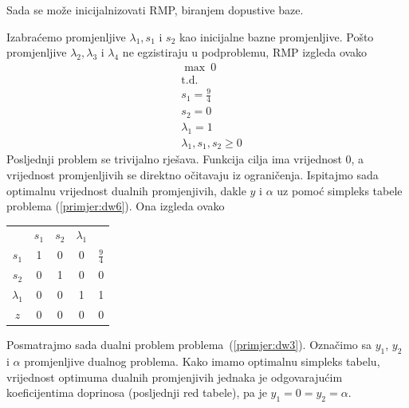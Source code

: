 \documentclass[b5paper, utf8, 11pt, colorlinks]{book}
\theoremstyle{definition}
\begin{document}
Sada se može inicijalnizovati RMP, biranjem dopustive baze.

Izabraćemo promjenljive $\lambda_1, s_1$ i $s_2$ kao inicijalne bazne promjenljive. Pošto  promjenljive $\lambda_2,\lambda_3$ i $\lambda_4$ ne egzistiraju u podproblemu,  RMP izgleda ovako
      \begin{equation}
	\begin{aligned}\label{primjer:dw6}
		&\max\   0\\
		&\mbox{t.d.}\\  
		&s_1=\frac 94\\
		&s_2=0\\
		&\lambda_1 = 1\\
		&\lambda_1,s_1,s_2\geqslant 0
	\end{aligned}
\end{equation}
Posljednji problem se trivijalno rješava. Funkcija cilja ima vrijednost 0, a vrijednost promjenljivih se direktno očitavaju iz ograničenja. Ispitajmo sada optimalnu vrijednost dualnih promjenjivih, dakle $y$ i $\alpha$ uz pomoć simpleks tabele problema (\ref{primjer:dw6}). Ona izgleda ovako
\begin{center}

\begin{tabular}{c|cccc}
	       &$s_1$  & $ s_2$   & $\lambda_1$ &  \\
 $s_1$	   &  1  &   0      &   0         &  $\frac{9}{4}$ \\
  $s_2$	  &  0  &    1     &   0         &  0             \\
$\lambda_1$	  &  0  &    0     &   1         &  1   \\ \hline
	$z$   & 0  &    0     &   0         &  0
\end{tabular}
\end{center}
 
Posmatrajmo sada dualni problem problema~(\ref{primjer:dw3}). Označimo sa $y_1$, $y_2$ i $\alpha$ promjenljive dualnog problema. Kako imamo optimalnu simpleks tabelu, vrijednost optimuma dualnih promjenjivih jednaka je odgovarajućim koeficijentima doprinosa (posljednji red tabele), pa je $y_1 = 0 = y_2 = \alpha$. 

\end{document}
